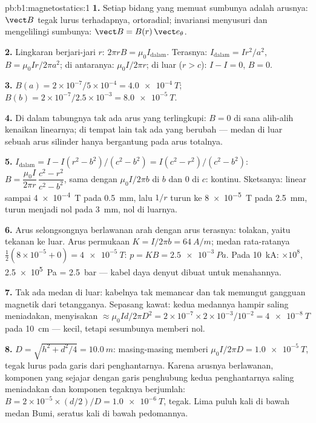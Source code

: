 \begin{solution}{pb:b1:magnetostatics:1}
\textbf{1.} Setiap bidang yang memuat sumbunya adalah 
arusnya: $\vect B$ tegak lurus terhadapnya, ortoradial; invariansi
menyusuri dan mengelilingi sumbunya: $\vect B = B(r)\,\vect e_\theta$.

\textbf{2.} Lingkaran berjari-jari $r$: $2\pi rB = \mu_0I_{\text{dalam}}$. Terasnya:
$I_{\text{dalam}} = Ir^2/a^2$, $B = \mu_0Ir/2\pi a^2$; di antaranya: $\mu_0I/2\pi r$;
di luar ($r > c$): $I - I = 0$, $B = 0$.

\textbf{3.} $B(a) = 2 \times 10^{-7}/5 \times 10^{-4} = \qty{4.0e-4}{T}$; $B(b) = 2 \times
10^{-7}/2.5 \times 10^{-3} = \qty{8.0e-5}{T}$.

\textbf{4.} Di dalam tabungnya tak ada arus yang terlingkupi: $B = 0$ di sana alih-alih
kenaikan linearnya; di tempat lain tak ada yang berubah --- medan di luar
sebuah arus silinder hanya bergantung pada arus totalnya.

\textbf{5.} $I_{\text{dalam}} = I - I(r^2 - b^2)/(c^2 - b^2) = I(c^2 - r^2)/(c^2 -
b^2)$: $B = \dfrac{\mu_0I}{2\pi r}\,\dfrac{c^2 - r^2}{c^2 - b^2}$, sama dengan $\mu_0I/2\pi b$ di
$b$ dan $0$ di $c$: kontinu. Sketsanya: linear sampai \qty{4e-4}{T} pada
\qty{0.5}{mm}, lalu $1/r$ turun ke \qty{8e-5}{T} pada \qty{2.5}{mm}, turun menjadi nol pada
\qty{3}{mm}, nol di luarnya.

\textbf{6.} Arus selongsongnya berlawanan arah dengan arus terasnya: tolakan,
yaitu tekanan ke luar. Arus permukaan $K = I/2\pi b = \qty{64}{A/m}$; medan rata-ratanya
$\tfrac12(8 \times 10^{-5} + 0) = \qty{4e-5}{T}$: $p = KB = \qty{2.5e-3}{Pa}$. Pada
\qty{10}{kA}: $\times10^8$, \qty{2.5e5}{Pa} = \qty{2.5}{bar} --- kabel daya
denyut dibuat untuk menahannya.

\textbf{7.} Tak ada medan di luar: kabelnya tak memancar dan tak memungut
gangguan magnetik dari tetangganya. Sepasang kawat: kedua
medannya hampir saling meniadakan, menyisakan $\approx \mu_0Id/2\pi D^2 = 2 \times 10^{-7} \times 2 \times
10^{-3}/10^{-2} = \qty{4e-8}{T}$ pada \qty{10}{cm} --- kecil, tetapi sesumbunya memberi
nol.

\textbf{8.} $D = \sqrt{h^2 + d^2/4} = \qty{10.0}{m}$: masing-masing memberi $\mu_0I/2\pi D =
\qty{1.0e-5}{T}$, tegak lurus pada garis dari penghantarnya. Karena
arusnya berlawanan, komponen yang sejajar dengan garis penghubung
kedua penghantarnya saling meniadakan dan komponen tegaknya berjumlah: $B = 2 \times 10^{-5} \times
(d/2)/D = \qty{1.0e-6}{T}$, tegak. Lima puluh kali di bawah medan Bumi,
seratus kali di bawah pedomannya.


\end{solution}
